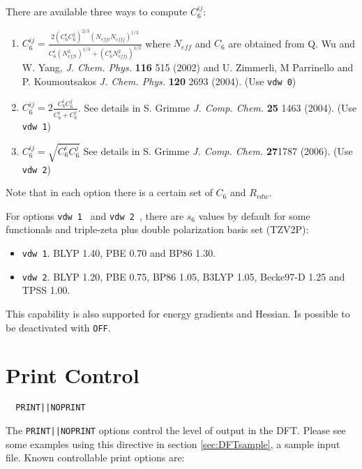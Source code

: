 There are available three ways to compute $C_6^{ij}$:
\begin{enumerate}
\item   $C_6^{ij}=
\frac{2(C_6^{i}C_6^{j})^{2/3}(N_{eff i}N_{eff j})^{1/3}}
{C_6^{i}(N_{eff i}^2)^{1/3}+(C_6^{i}N_{eff j}^2)^{1/3}}$ 
where $N_{eff}$ and $C_6$ are obtained from Q. Wu and W. Yang, \textit{J. Chem. Phys.} 
\textbf{116} 515 (2002) and U. Zimmerli, M Parrinello and P. Koumoutsakos 
\textit{J. Chem. Phys.} \textbf{120} 2693 (2004). (Use {\tt vdw 0})

\item $C_6^{ij}=2\frac{C_6^{i}C_6^{j}}{C_6^{i}+C_6^{j}}$.
See details in 
S. Grimme \textit{J. Comp. Chem.} \textbf{25} 1463 (2004).
(Use {\tt vdw 1})

\item $C_6^{ij}=\sqrt{C_6^{i}C_6^{j}}$
See details in 
S. Grimme \textit{J. Comp. Chem.} \textbf{27}1787 (2006).
(Use {\tt vdw 2})

\end{enumerate}

Note that in each option there is a certain set of $C_6$ and $R_{vdw}$.

For options {\tt vdw 1 } and {\tt vdw 2 }, there are $s_6$ values by default for some functionals 
and triple-zeta plus double polarization basis set (TZV2P):
\begin{itemize}
\item {\tt vdw 1}. BLYP 1.40, PBE 0.70 and BP86 1.30.
\item {\tt vdw 2}. BLYP 1.20, PBE 0.75, BP86 1.05, B3LYP 1.05, Becke97-D 1.25 and TPSS 1.00.
\end{itemize}

This capability is also supported for energy gradients and Hessian.
Is possible to be deactivated with \verb+OFF+.

\section{Print Control}
\begin{verbatim}
  PRINT||NOPRINT
\end{verbatim}

The \verb+PRINT||NOPRINT+ options control the level of output in the
DFT.  Please see some examples using this directive in
section  \ref{sec:DFTsample}, a sample input file.
  Known controllable print options are:

